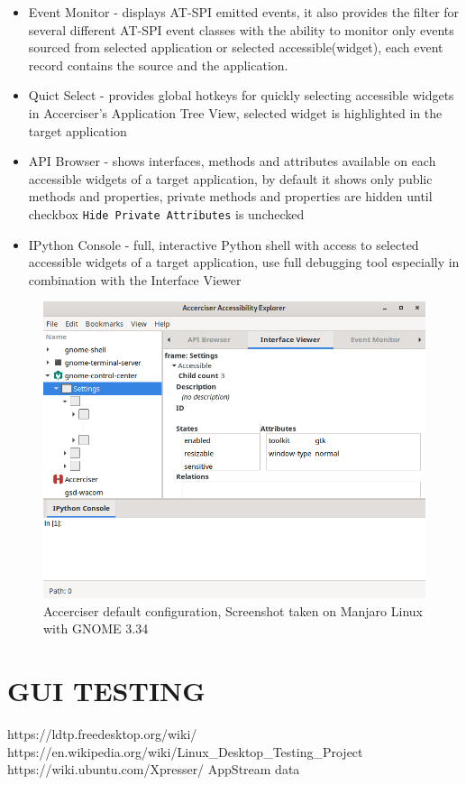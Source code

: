 \begin{itemize}
    \item Event Monitor - displays AT-SPI emitted events, it also provides the filter for several different AT-SPI event classes with the ability to monitor only events sourced from selected application or selected accessible(widget), each event record contains the source and the application.
    \item Quict Select - provides global hotkeys for quickly selecting accessible widgets in Accerciser's Application Tree View, selected widget is highlighted in the target application
    \item API Browser - shows interfaces, methods and attributes available on each accessible widgets of a target application, by default it shows only public methods and properties, private methods and properties are hidden until checkbox \texttt{Hide Private Attributes} is unchecked
    \item IPython Console - full, interactive Python shell with access to selected accessible widgets of a target application, use full debugging tool especially in combination with the Interface Viewer
\end{itemize}

\begin{figure}[hbt]
	\centering
	\includegraphics[width=1\textwidth]{obrazky-figures/accerciser.png}
	\caption{Accerciser default configuration, Screenshot taken on Manjaro Linux with GNOME 3.34}
	\label{Accerciser}
\end{figure}

\chapter{GUI TESTING}
https://ldtp.freedesktop.org/wiki/
https://en.wikipedia.org/wiki/Linux_Desktop_Testing_Project
https://wiki.ubuntu.com/Xpresser/
AppStream data
